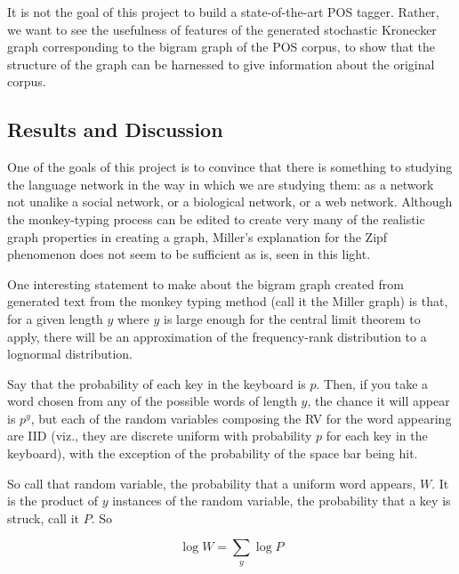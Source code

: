 \documentclass[12pt]{article}
\begin{document}

It is not the goal of this project to build a state-of-the-art POS tagger. Rather, we want to see the usefulness of features of the generated stochastic Kronecker graph corresponding to the bigram graph of the POS corpus, to show that the structure of the graph can be harnessed to give information about the original corpus.



\subsection{Results and Discussion}

One of the goals of this project is to convince that there is something to studying the language network in the way in which we are studying them: as a network not unalike a social network, or a biological network, or a web network. Although the monkey-typing process can be edited to create very many of the realistic graph properties in creating a graph, Miller's explanation for the Zipf phenomenon does not seem to be sufficient as is, seen in this light.

One interesting statement to make about the bigram graph created from generated text from the monkey typing method (call it the Miller graph) is that, for a given length $y$ where $y$ is large enough for the central limit theorem to apply, there will be an approximation of the frequency-rank distribution to a lognormal distribution.

Say that the probability of each key in the keyboard is $p$. Then, if you take a word chosen from any of the possible words of length $y$, the chance it will appear is $p^y$, but each of the random variables composing the RV for the word appearing are IID (viz., they are discrete uniform with probability $p$ for each key in the keyboard), with the exception of the probability of the space bar being hit.

So call that random variable, the probability that a uniform word appears, $W$. It is the product of $y$ instances of the random variable, the probability that a key is struck, call it $P$. So

$$ \log W = \sum_y \log P $$
\end{document}
